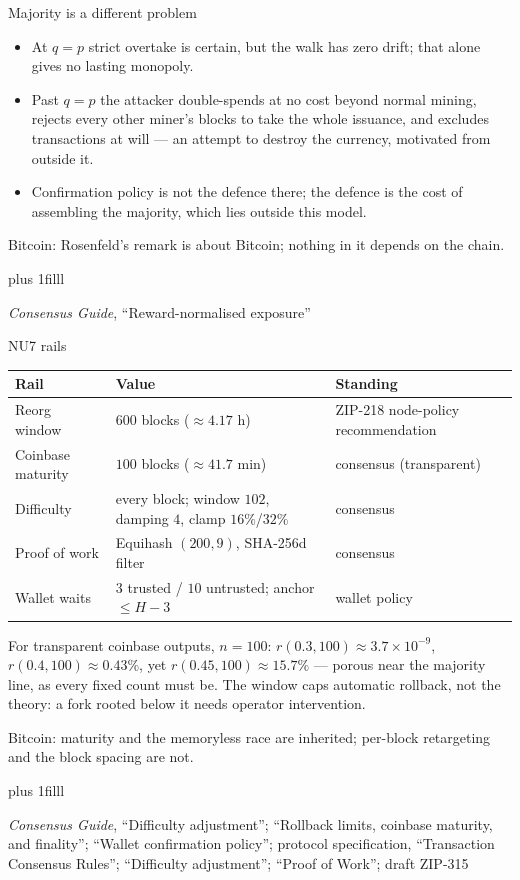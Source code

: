 \documentclass[aspectratio=169,11pt]{beamer}
\newcommand{\src}[1]{\par\vskip0pt plus 1filll
  {\fontsize{6}{7.2}\selectfont\color{arbdim}\raggedright #1\par}}
\begin{document}
\begin{frame}{Majority is a different problem}
\begin{itemize}
\item At $q = p$ strict overtake is certain, but the walk has zero
  drift; that alone gives no lasting monopoly.
\item Past $q = p$ the attacker double-spends at no cost beyond normal
  mining, rejects every other miner's blocks to take the whole
  issuance, and excludes transactions at will --- an attempt to destroy
  the currency, motivated from outside it.
\item Confirmation policy is not the defence there; the defence is the
  cost of assembling the majority, which lies outside this model.
\end{itemize}
\medskip
\alert{Bitcoin:} Rosenfeld's remark is about Bitcoin; nothing in it
depends on the chain.
\src{\emph{Consensus Guide}, ``Reward-normalised exposure''}
\end{frame}

\begin{frame}{NU7 rails}
\small
\begin{tabular}{@{}l p{6.3cm} p{3.6cm}@{}}
\toprule
Rail & Value & Standing \\
\midrule
Reorg window & $600$ blocks ($\approx 4.17$ h) & ZIP-218 node-policy
  recommendation \\
Coinbase maturity & $100$ blocks ($\approx 41.7$ min)
  & consensus (transparent) \\
Difficulty & every block; window $102$, damping $4$, clamp $16\%$/$32\%$
  & consensus \\
Proof of work & Equihash $(200, 9)$, SHA-256d filter & consensus \\
Wallet waits & $3$ trusted / $10$ untrusted; anchor $\leq H - 3$
  & wallet policy \\
\bottomrule
\end{tabular}
\medskip

For transparent coinbase outputs, $n = 100$: $r(0.3, 100) \approx 3.7
\times 10^{-9}$, $r(0.4, 100) \approx 0.43\%$, yet $r(0.45, 100)
\approx 15.7\%$ --- porous near the majority line, as every fixed count
must be. The window caps automatic rollback, not the theory: a fork
rooted below it needs operator intervention.
\medskip

\alert{Bitcoin:} maturity and the memoryless race are inherited;
per-block retargeting and the block spacing are not.
\src{\emph{Consensus Guide}, ``Difficulty adjustment''; ``Rollback limits, coinbase maturity, and finality''; ``Wallet confirmation policy'';
  protocol specification, ``Transaction Consensus Rules'';
  ``Difficulty adjustment''; ``Proof of Work''; draft ZIP-315}
\end{frame}
\end{document}
